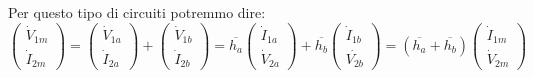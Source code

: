 \documentclass[a4paper,11pt]{article}
\begin{document}
Per questo tipo di circuiti potremmo dire:
$$
\begin{pmatrix}
	\dot{V}_{1m} \\ \dot{I}_{2m}
\end{pmatrix}
=
\begin{pmatrix}
	\dot{V}_{1a} \\ \dot{I}_{2a}
\end{pmatrix}
+
\begin{pmatrix}
	\dot{V}_{1b} \\ \dot{I}_{2b}
\end{pmatrix}
=
\overline{h_a}
\begin{pmatrix}
	\dot{I}_{1a} \\ \dot{V}_{2a}
\end{pmatrix}
+
\overline{h_b}
\begin{pmatrix}
	\dot{I}_{1b} \\ \dot{V_{2b}}
\end{pmatrix}
=
(\overline{h_a} + \overline{h_b})
\begin{pmatrix}
	\dot{I}_{1m} \\ \dot{V}_{2m}
\end{pmatrix}
$$
\end{document}
